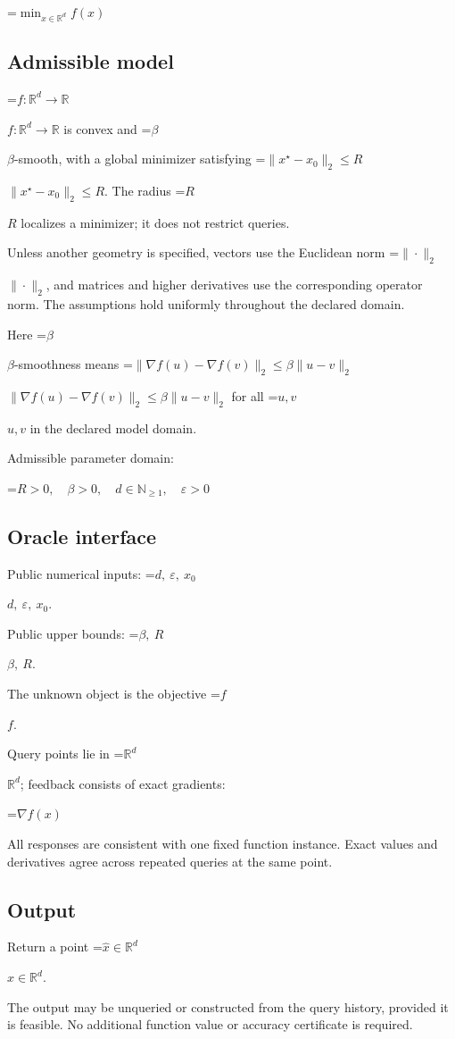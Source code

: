 \documentclass[10pt,a4paper]{article}
\newcommand{\AtlasMath}[1]{\par\begingroup\centering\setbox0=\hbox{$\displaystyle #1$}\ifdim\wd0>1.4\linewidth\typeout{ATLAS WIDE FORMULA: \the\wd0}\fi\ifdim\wd0>\linewidth\resizebox{\linewidth}{!}{\box0}\else\box0\fi\par\endgroup}
\newcommand{\AtlasInlineMath}[1]{\begingroup\setbox0=\hbox{$#1$}\ifdim\wd0>.4\linewidth\endgroup\AtlasMath{#1}\else\endgroup$#1$\fi}
\begin{document}
\AtlasMath{\min_{x\in \mathbb{R}^d}f(x)}


\subsection{Admissible model}
\AtlasInlineMath{f:\mathbb R^d\to\mathbb R} is convex and \AtlasInlineMath{\beta}-smooth, with a global minimizer satisfying \AtlasInlineMath{\|x^\star-x_0\|_2\le R}. The radius \AtlasInlineMath{R} localizes a minimizer; it does not restrict queries.

Unless another geometry is specified, vectors use the Euclidean norm \AtlasInlineMath{\|\cdot\|_2}, and matrices and higher derivatives use the corresponding operator norm. The assumptions hold uniformly throughout the declared domain.

Here \AtlasInlineMath{\beta}-smoothness means \AtlasInlineMath{\|\nabla f(u)-\nabla f(v)\|_2\le\beta\|u-v\|_2} for all \AtlasInlineMath{u,v} in the declared model domain.

Admissible parameter domain:


\AtlasMath{R>0,\quad \beta>0,\quad d\in\mathbb{N}_{\ge1},\quad \varepsilon>0}


\subsection{Oracle interface}
Public numerical inputs: \AtlasInlineMath{d,\ \varepsilon,\ x_0}.

Public upper bounds: \AtlasInlineMath{\beta,\ R}.

The unknown object is the objective \AtlasInlineMath{f}.

Query points lie in \AtlasInlineMath{\mathbb{R}^d}; feedback consists of exact gradients:


\AtlasMath{\nabla f(x)}


All responses are consistent with one fixed function instance. Exact values and derivatives agree across repeated queries at the same point.

\subsection{Output}
Return a point \AtlasInlineMath{\widehat x\in\mathbb R^d}.

The output may be unqueried or constructed from the query history, provided it is feasible. No additional function value or accuracy certificate is required.
\end{document}
